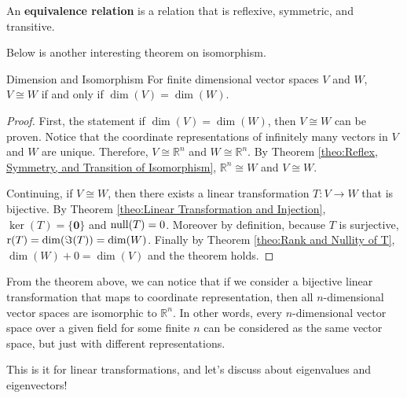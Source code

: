 \documentclass[../../main.tex]{subfiles}
\begin{document}
\begin{definition}{}{}
An \textbf{equivalence relation} is a relation that is reflexive,
symmetric, and transitive.
\end{definition}

Below is another interesting theorem on isomorphism.

\begin{theorem}{}{Dimension and Isomorphism}
For finite dimensional vector spaces $V$ and $W$, $V \cong W$ if and
only if $\dim(V) = \dim(W)$.
\end{theorem}
\begin{proof}
First, the statement if $\dim(V) = \dim(W)$, then $V \cong W$ can be
proven. Notice that the coordinate representations of infinitely many
vectors in $V$ and $W$ are unique. Therefore, $V \cong \mathbb{R}^n$
and $W \cong \mathbb{R}^n$. By Theorem \ref{theo:Reflex, Symmetry, and
Transition of Isomorphism}, $\mathbb{R}^n \cong W$ and $V \cong W$.

Continuing, if $V \cong W$, then there exists a linear transformation
$T: V \to W$ that is bijective. By Theorem \ref{theo:Linear
Transformation and Injection}, $\ker(T) = \{ \mathbf{0} \}$ and
$\operatorname{null}(T) = 0$. Moreover by definition, because $T$ is surjective,
$\operatorname{r}(T) = \dim(\Im(T)) = \dim(W)$. Finally by Theorem \ref{theo:Rank
and Nullity of T}, $\dim(W) + 0 = \dim(V)$ and the theorem holds.
\end{proof}

From the theorem above, we can notice that if we consider a bijective
linear transformation that maps to coordinate representation, then
all $n$-dimensional vector spaces are isomorphic to $\mathbb{R}^n$.
In other words, every $n$-dimensional vector space over a given
field for some finite $n$ can be considered as the same vector space,
but just with different representations.

This is it for linear transformations, and let's discuss about
eigenvalues and eigenvectors!
\end{document}
